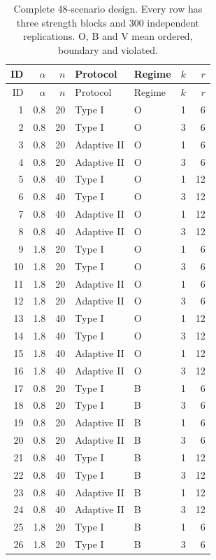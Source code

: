 \begin{longtable}{rrrllrr}
\caption{Complete 48-scenario design. Every row has three strength blocks and 300 independent replications. O, B and V mean ordered, boundary and violated.}\label{tab:design}\\
\toprule
ID & $\alpha$ & $n$ & Protocol & Regime & $k$ & $r$ \\
\midrule
\endfirsthead
\toprule
ID & $\alpha$ & $n$ & Protocol & Regime & $k$ & $r$ \\
\midrule
\endhead
1 & 0.8 & 20 & Type I & O & 1 & 6 \\
2 & 0.8 & 20 & Type I & O & 3 & 6 \\
3 & 0.8 & 20 & Adaptive II & O & 1 & 6 \\
4 & 0.8 & 20 & Adaptive II & O & 3 & 6 \\
5 & 0.8 & 40 & Type I & O & 1 & 12 \\
6 & 0.8 & 40 & Type I & O & 3 & 12 \\
7 & 0.8 & 40 & Adaptive II & O & 1 & 12 \\
8 & 0.8 & 40 & Adaptive II & O & 3 & 12 \\
9 & 1.8 & 20 & Type I & O & 1 & 6 \\
10 & 1.8 & 20 & Type I & O & 3 & 6 \\
11 & 1.8 & 20 & Adaptive II & O & 1 & 6 \\
12 & 1.8 & 20 & Adaptive II & O & 3 & 6 \\
13 & 1.8 & 40 & Type I & O & 1 & 12 \\
14 & 1.8 & 40 & Type I & O & 3 & 12 \\
15 & 1.8 & 40 & Adaptive II & O & 1 & 12 \\
16 & 1.8 & 40 & Adaptive II & O & 3 & 12 \\
17 & 0.8 & 20 & Type I & B & 1 & 6 \\
18 & 0.8 & 20 & Type I & B & 3 & 6 \\
19 & 0.8 & 20 & Adaptive II & B & 1 & 6 \\
20 & 0.8 & 20 & Adaptive II & B & 3 & 6 \\
21 & 0.8 & 40 & Type I & B & 1 & 12 \\
22 & 0.8 & 40 & Type I & B & 3 & 12 \\
23 & 0.8 & 40 & Adaptive II & B & 1 & 12 \\
24 & 0.8 & 40 & Adaptive II & B & 3 & 12 \\
25 & 1.8 & 20 & Type I & B & 1 & 6 \\
26 & 1.8 & 20 & Type I & B & 3 & 6 \\

\end{longtable}
